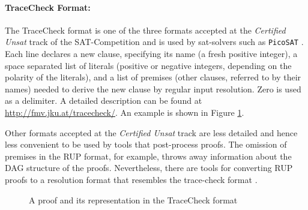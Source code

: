 \documentclass{llncs}
\begin{document}
\paragraph{TraceCheck Format: }

The TraceCheck \cite{tracecheck} format is one of the three formats accepted at the \emph{Certified Unsat} track of the SAT-Competition and is used by sat-solvers such as \texttt{PicoSAT} \cite{Biere_picosatessentials}. Each line declares a new clause, specifying its name (a fresh positive integer), a space separated list of literals (positive or negative integers, depending on the polarity of the literals), and a list of premises (other clauses, referred to by their names) needed to derive the new clause by regular input resolution. Zero is used as a delimiter. A detailed description can be found at \url{http://fmv.jku.at/tracecheck/}. An example is shown in Figure \ref{TraceCheckProof}.

Other formats accepted at the \emph{Certified Unsat} track are less detailed and hence less convenient to be used by tools that post-process proofs. The omission of premises in the RUP format, for example, throws away information about the DAG structure of the proofs. Nevertheless, there are tools for converting RUP proofs to a resolution format that resembles the trace-check format \cite{van2008verifying}.


\begin{figure}[h]
	\caption{A proof and its representation in the TraceCheck format}
	\label{TraceCheckProof}
\end{figure}
\end{document}
